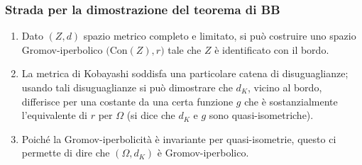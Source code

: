 \begin{frame}
  \frametitle{Strada per la dimostrazione del teorema di BB}
  \begin{enumerate}
    \item Dato $(Z,d)$ spazio metrico completo e limitato, si può costruire uno spazio Gromov-iperbolico $\big(\text{Con}(Z),r\big)$ tale che $Z$ è identificato con il bordo.
    \pause
    \item La metrica di Kobayashi soddisfa una particolare catena di disuguaglianze; \pause usando tali disuguaglianze si può dimostrare che $d_K$, vicino al bordo, differisce per una costante da una certa funzione $g$ che è sostanzialmente l'equivalente di $r$ per $\Omega$ (si dice che $d_K$ e $g$ sono quasi-isometriche).
    \pause
    \item Poiché la Gromov-iperbolicità è invariante per quasi-isometrie, questo ci permette di dire che $(\Omega,d_K)$ è Gromov-iperbolico.
  \end{enumerate}
\end{frame}

